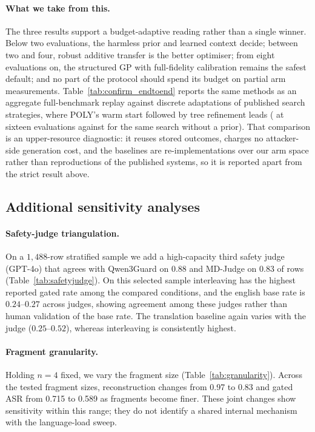 \documentclass{article}
\begin{document}
\paragraph{What we take from this.} The three results support a budget-adaptive reading rather than a
single winner. Below two evaluations, the harmless prior and learned context decide; between two and
four, robust additive transfer is the better optimiser; from eight evaluations on, the structured GP
with full-fidelity calibration remains the safest default; and no part of the protocol should spend
its budget on partial arm measurements. Table~\ref{tab:confirm_endtoend} reports the same methods as
an aggregate full-benchmark replay against discrete adaptations of published search strategies, where
POLY's warm start followed by tree refinement leads (\pjcfEndPolyTreeAtBudget{} at sixteen
evaluations against \pjcfEndFlatAtBudget{} for the same search without a prior). That comparison is
an upper-resource diagnostic: it reuses stored outcomes, charges no attacker-side generation cost,
and the baselines are re-implementations over our arm space rather than reproductions of the
published systems, so it is reported apart from the strict result above.


\subsection{Additional sensitivity analyses}
\label{app:additional}
\paragraph{Safety-judge triangulation.}
On a $1{,}488$-row stratified sample we add a high-capacity third safety judge
(GPT-4o) that agrees with Qwen3Guard on $0.88$ and MD-Judge on $0.83$ of rows
(Table~\ref{tab:safetyjudge}). On this selected sample interleaving has the highest reported gated rate
among the compared conditions, and the english base rate is $0.24$--$0.27$ across judges, showing agreement among these judges rather than human validation of the
base rate. The translation
baseline again varies with the judge ($0.25$--$0.52$), whereas interleaving is
consistently highest.

\paragraph{Fragment granularity.}
Holding $n{=}4$ fixed, we vary the fragment size (Table~\ref{tab:granularity}).
Across the tested fragment sizes, reconstruction changes from 0.97 to 0.83
and gated ASR from 0.715 to 0.589 as fragments become finer. These joint changes
show sensitivity within this range; they do not identify a shared internal
mechanism with the language-load sweep.
\end{document}
